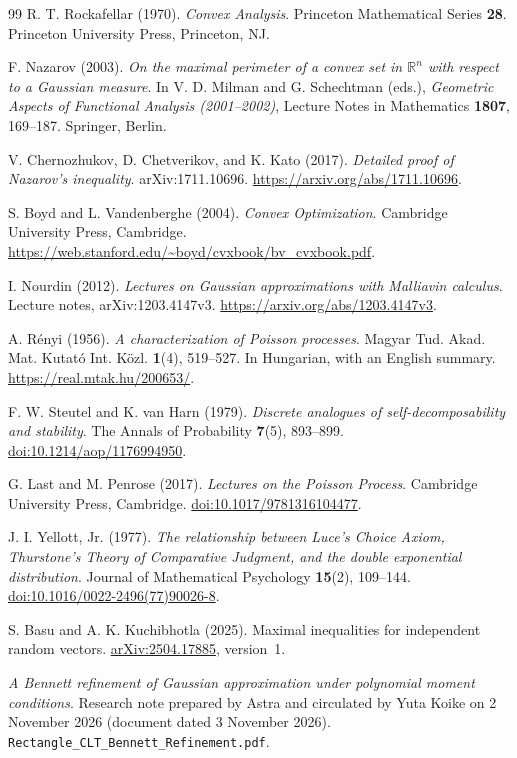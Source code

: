 \documentclass[11pt,letterpaper]{article}
\theoremstyle{remark}
\newcommand{\R}{\mathbb R}
\begin{document}
\begin{thebibliography}{99}
R. T. Rockafellar (1970).
\emph{Convex Analysis}.
Princeton Mathematical Series \textbf{28}.
Princeton University Press, Princeton, NJ.

F. Nazarov (2003).
\emph{On the maximal perimeter of a convex set in \(\R^n\)
with respect to a Gaussian measure}.
In V. D. Milman and G. Schechtman (eds.),
\emph{Geometric Aspects of Functional Analysis (2001--2002)},
Lecture Notes in Mathematics \textbf{1807}, 169--187.
Springer, Berlin.

V. Chernozhukov, D. Chetverikov, and K. Kato (2017).
\emph{Detailed proof of Nazarov's inequality}.
arXiv:1711.10696.
\url{https://arxiv.org/abs/1711.10696}.

S. Boyd and L. Vandenberghe (2004).
\emph{Convex Optimization}.
Cambridge University Press, Cambridge.
\url{https://web.stanford.edu/~boyd/cvxbook/bv_cvxbook.pdf}.

I. Nourdin (2012).
\emph{Lectures on Gaussian approximations with Malliavin calculus}.
Lecture notes, arXiv:1203.4147v3.
\url{https://arxiv.org/abs/1203.4147v3}.

A. R\'enyi (1956).
\emph{A characterization of Poisson processes}.
Magyar Tud. Akad. Mat. Kutat\'o Int. K\"ozl. \textbf{1}(4), 519--527.
In Hungarian, with an English summary.
\url{https://real.mtak.hu/200653/}.

F. W. Steutel and K. van Harn (1979).
\emph{Discrete analogues of self-decomposability and stability}.
The Annals of Probability \textbf{7}(5), 893--899.
\href{https://doi.org/10.1214/aop/1176994950}{doi:10.1214/aop/1176994950}.

G. Last and M. Penrose (2017).
\emph{Lectures on the Poisson Process}.
Cambridge University Press, Cambridge.
\href{https://doi.org/10.1017/9781316104477}{doi:10.1017/9781316104477}.

J. I. Yellott, Jr. (1977).
\emph{The relationship between Luce's Choice Axiom, Thurstone's Theory
of Comparative Judgment, and the double exponential distribution}.
Journal of Mathematical Psychology \textbf{15}(2), 109--144.
\href{https://doi.org/10.1016/0022-2496(77)90026-8}{doi:10.1016/0022-2496(77)90026-8}.

S. Basu and A. K. Kuchibhotla (2025).
Maximal inequalities for independent random vectors.
\href{https://arxiv.org/abs/2504.17885}{arXiv:2504.17885}, version~1.

\emph{A Bennett refinement of Gaussian approximation under polynomial
moment conditions}. Research note prepared by Astra and circulated by
Yuta Koike on 2 November 2026 (document dated 3 November 2026).
\texttt{Rectangle\_CLT\_Bennett\_Refinement.pdf}.
\end{thebibliography}
\end{document}
